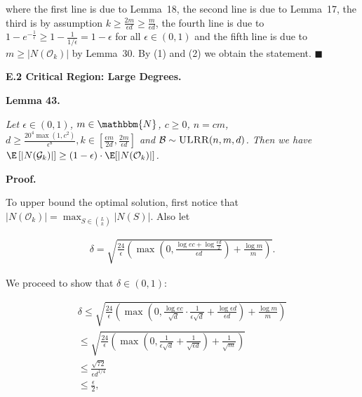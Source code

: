 \documentclass[10pt,a4paper]{article}
\begin{document}
where the first line is due to Lemma 18, the second line is due to Lemma 17, the third is by assumption $k\geq\frac{2m}{\epsilon d}\geq\frac{m}{\epsilon d}$, the fourth line is due to $1-e^{-\frac{1}{\epsilon}}\geq 1-\frac{1}{1/\epsilon}=1-\epsilon$ for all $\epsilon\in(0,1)$ and the fifth line is due to $m\geq|N(\mathcal{O}_{k})|$ by Lemma 30.
By (1) and (2) we obtain the statement.
\ensuremath{\blacksquare}\par






\par\medskip\noindent\textbf{E.2 Critical Region: Large Degrees.}\par





\par\medskip\noindent\textbf{\textbf{Lemma 43}\textbf{.}}\par



\emph{Let $\epsilon\in(0,1)$, $m\in\mathbbm{N}$, $c\geq 0$, $n=cm$, $d\geq\frac{20^{4}\max(1,c^{2})}{\epsilon^{8}},k\in[\frac{\epsilon m}{2d},\frac{2m}{\epsilon d}]$ and $\mathcal{B}\sim\textsc{ULRR}(n,m,d)$.
Then we have $\E\left[|N(\mathcal{G}_{k})|\right]\geq\left(1-\epsilon\right)\cdot\E[|N(\mathcal{O}_{k})|]$.}\par






\par\medskip\noindent\textbf{Proof.}\par



To upper bound the optimal solution, first notice that $|N(\mathcal{O}_{k})|=\max_{S\in\binom{L}{k}}|N(S)|$.
Also let\par


\[\begin{gathered}
\delta=\sqrt{\frac{24}{\epsilon}\left(\max\left(0,\frac{\log{ec}+\log{\frac{\epsilon d}{2}}}{\epsilon d}\right)+\frac{\log{m}}{m}\right)}.
\end{gathered}\]


We proceed to show that $\delta\in(0,1)$:\par


\[\begin{gathered}
\displaystyle\delta \displaystyle\leq\sqrt{\frac{24}{\epsilon}\left(\max\left(0,\frac{\log{ec}}{\sqrt{d}}\cdot\frac{1}{\epsilon\sqrt{d}}+\frac{\log{\epsilon d}}{\epsilon d}\right)+\frac{\log{m}}{m}\right)} \\
\displaystyle\leq\sqrt{\frac{24}{\epsilon}\left(\max\left(0,\frac{1}{\epsilon\sqrt{d}}+\frac{1}{\sqrt{\epsilon d}}\right)+\frac{1}{\sqrt{m}}\right)} \\
\displaystyle\leq\frac{\sqrt{72}}{\epsilon d^{1/4}} \\
\displaystyle\leq\frac{\epsilon}{2},
\end{gathered}\]
\end{document}
